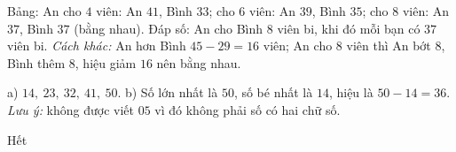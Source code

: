 \documentclass[../main.tex]{subfiles}
\begin{document}
 Bảng: An cho $4$ viên: An $41$, Bình $33$; cho $6$ viên: An $39$, Bình $35$; cho $8$ viên: An $37$, Bình $37$ (bằng nhau). Đáp số: An cho Bình $8$ viên bi, khi đó mỗi bạn có $37$ viên bi. \textit{Cách khác:} An hơn Bình $45-29=16$ viên; An cho $8$ viên thì An bớt $8$, Bình thêm $8$, hiệu giảm $16$ nên bằng nhau.

 a) $14,\ 23,\ 32,\ 41,\ 50$. b) Số lớn nhất là $50$, số bé nhất là $14$, hiệu là $50-14=36$. \textit{Lưu ý:} không được viết $05$ vì đó không phải số có hai chữ số.

\begin{center}
       \faGg\faGg\quad Hết \quad\faGg\faGg
\end{center}
\end{document}
